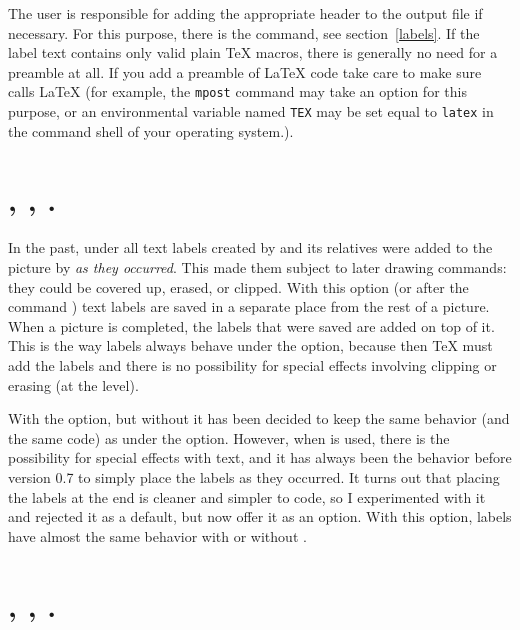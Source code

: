 \documentclass[letterpaper]{article}
\begin{document}
The user is responsible for adding the appropriate 
header to the output file if necessary. For this purpose, there is the
 command, see section~\ref{labels}. If the label text
contains only valid plain \TeX{} macros, there is generally no need for
a  preamble at all. If you add a 
preamble of \LaTeX{} code take care to make sure \MP{} calls \LaTeX{}
(for example, the \texttt{mpost} command may take an option for this
purpose, or an environmental variable named \texttt{TEX} may be set
equal to \texttt{latex} in the command shell of your operating system.).


\section{, , .}
\label{overlaylabels}
%
%

In the past, under  all text labels created by 
and its relatives were added to the picture by \MP{} \emph{as they
occurred}. This made them subject to later drawing commands: they could
be covered up, erased, or clipped. With this option (or after the
command ) text labels are saved in a separate place
from the rest of a picture. When a picture is completed, the labels that
were saved are added on top of it. This is the way labels always behave
under the  option, because then \TeX{} must add the labels
and there is no possibility for special effects involving clipping or
erasing (at the \MF{} level).

With the  option, but without  it has been
decided to keep the same behavior (and the same code) as under the
 option. However, when  is used, there is
the possibility for special effects with text, and it has always been
the behavior before version 0.7 to simply place the labels as they
occurred. It turns out that placing the labels at the end is cleaner and
simpler to code, so I experimented with it and rejected it as a default,
but now offer it as an option. With this option, \mfp{} labels have
almost the same behavior with or without .


\section{, ,
.}\label{truebbox}
%
%
\end{document}
